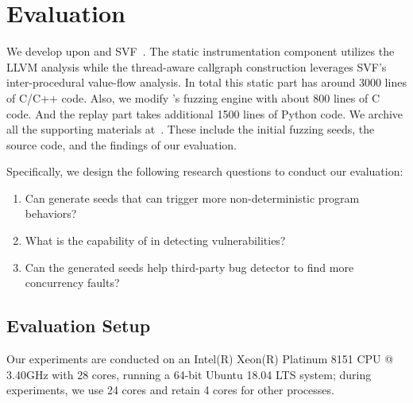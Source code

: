 \vspace{11pt}

 
\section{Evaluation}

We develop \mtfuzz upon \FOT and SVF~\cite{Sui:2016:SVF,DBLP:conf/ppopp/DiS16,DBLP:conf/cgo/SuiDX16}. 
The static instrumentation component utilizes the LLVM analysis while the 
thread-aware callgraph construction leverages SVF's inter-procedural value-flow 
analysis. In total this static part has around 3000 lines of C/C++ code. Also, 
we modify \FOT's fuzzing engine with about 800 lines of C code. And the replay part 
takes additional 1500 lines of Python code. We archive all the supporting materials 
at~\cite{mtfuzz-webpage}. These include the initial 
fuzzing seeds, the source code, and the findings of our evaluation.

Specifically, we design the following research questions to conduct our evaluation:
\begin{enumerate}[{\bf RQ1}]
    \item Can \mtfuzz generate seeds that can trigger more non-deterministic 
			program behaviors?
    \item What is the capability of \mtfuzz in detecting vulnerabilities?
    \item Can the generated seeds help third-party bug detector to find more 
			concurrency faults?
\end{enumerate}

\subsection{Evaluation Setup}
Our experiments are conducted on an Intel(R) Xeon(R) Platinum
8151 CPU @ 3.40GHz with 28 cores, running a 64-bit Ubuntu 18.04
LTS system; during experiments, we use 24 cores and retain 4 cores
for other processes.

